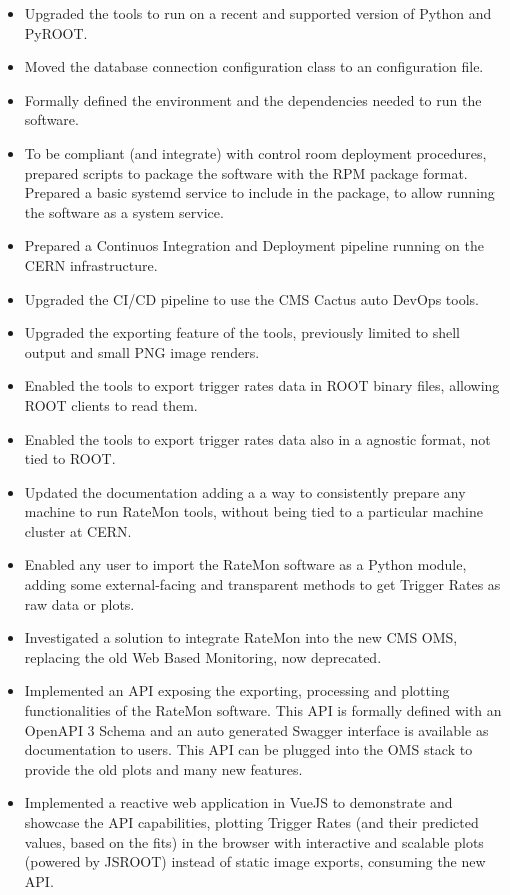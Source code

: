 \documentclass[a4, oneside, 10pt, nobib]{memoir}
\begin{document}
		\begin{itemize}

		\item Upgraded the tools to run on a recent and supported version of Python and PyROOT.
		\item Moved the database connection configuration class to an configuration file.
		\item Formally defined the environment and the dependencies needed to run the software.
		\item To be compliant (and integrate) with control room deployment procedures, prepared scripts to package the software with the RPM package format. Prepared a basic systemd service to include in the package, to allow running the software as a system service.
		\item Prepared a Continuos Integration and Deployment pipeline running on the CERN infrastructure.
		\item Upgraded the CI/CD pipeline to use the CMS Cactus auto DevOps tools.
		\item Upgraded the exporting feature of the tools, previously limited to shell output and small PNG image renders.
		\item Enabled the tools to export trigger rates data in ROOT binary files, allowing ROOT clients to read them.
		\item Enabled the tools to export trigger rates data also in a agnostic format, not tied to ROOT.
		\item Updated the documentation adding a a way to consistently prepare any machine to run RateMon tools, without being tied to a particular machine cluster at CERN.
		\item Enabled any user to import the RateMon software as a Python module, adding some external-facing and transparent methods to get Trigger Rates as raw data or plots.
		\item Investigated a solution to integrate RateMon into the new CMS OMS, replacing the old Web Based Monitoring, now deprecated.
		\item Implemented an API exposing the exporting, processing and plotting functionalities of the RateMon software. This API is formally defined with an OpenAPI 3 Schema and an auto generated Swagger interface is available as documentation to users. This API can be plugged into the OMS stack to provide the old plots and many new features.
		\item Implemented a reactive web application in VueJS to demonstrate and showcase the API capabilities, plotting Trigger Rates (and their predicted values, based on the fits) in the browser with interactive and scalable plots (powered by JSROOT) instead of static image exports, consuming the new API.

\end{itemize}
\end{document}
